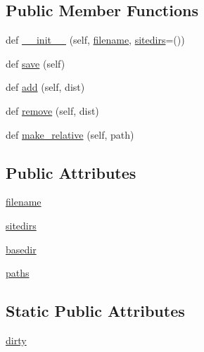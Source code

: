 \subsection*{Public Member Functions}
\begin{DoxyCompactItemize}
\item 
def \hyperlink{classsetuptools_1_1command_1_1easy__install_1_1PthDistributions_a1ca1a1ca566543e0e54d7ae015a16dc5}{\+\_\+\+\_\+init\+\_\+\+\_\+} (self, \hyperlink{classsetuptools_1_1command_1_1easy__install_1_1PthDistributions_ad28df9eb65540b9f423ed563a51eec10}{filename}, \hyperlink{classsetuptools_1_1command_1_1easy__install_1_1PthDistributions_a23bbbd0c5ba2b4108d346559451b5788}{sitedirs}=())
\item 
def \hyperlink{classsetuptools_1_1command_1_1easy__install_1_1PthDistributions_ab4d9f759b78444fc81dd9d9219c11031}{save} (self)
\item 
def \hyperlink{classsetuptools_1_1command_1_1easy__install_1_1PthDistributions_a9225a5df3c1a4af13a45aa4d92e83cbf}{add} (self, dist)
\item 
def \hyperlink{classsetuptools_1_1command_1_1easy__install_1_1PthDistributions_ae249a3d2339aedfa56143112cb755032}{remove} (self, dist)
\item 
def \hyperlink{classsetuptools_1_1command_1_1easy__install_1_1PthDistributions_a0dbff6cabb5ea6864cc70563aef90507}{make\+\_\+relative} (self, path)
\end{DoxyCompactItemize}
\subsection*{Public Attributes}
\begin{DoxyCompactItemize}
\item 
\hyperlink{classsetuptools_1_1command_1_1easy__install_1_1PthDistributions_ad28df9eb65540b9f423ed563a51eec10}{filename}
\item 
\hyperlink{classsetuptools_1_1command_1_1easy__install_1_1PthDistributions_a23bbbd0c5ba2b4108d346559451b5788}{sitedirs}
\item 
\hyperlink{classsetuptools_1_1command_1_1easy__install_1_1PthDistributions_a4ae0b9878f4e790842de737042c8e276}{basedir}
\item 
\hyperlink{classsetuptools_1_1command_1_1easy__install_1_1PthDistributions_aaeff84e1e64e746b8f64c993a7b23c4d}{paths}
\end{DoxyCompactItemize}
\subsection*{Static Public Attributes}
\begin{DoxyCompactItemize}
\item 
\hyperlink{classsetuptools_1_1command_1_1easy__install_1_1PthDistributions_ace5478320ad351592e00e5682b9c8ae2}{dirty}
\end{DoxyCompactItemize}


